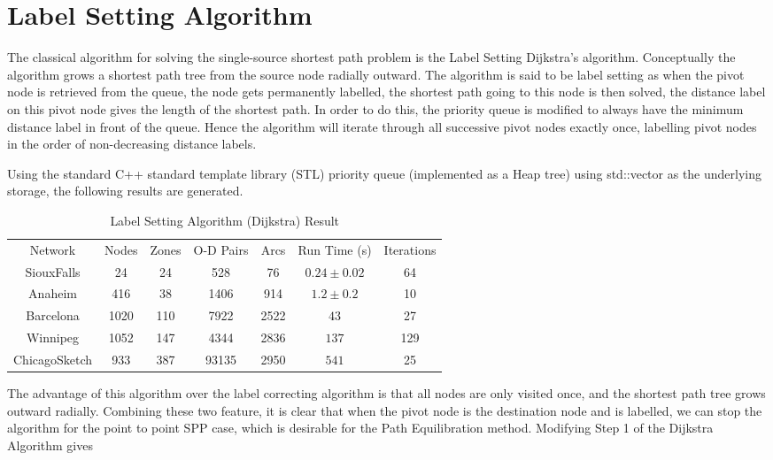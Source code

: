\section{Label Setting Algorithm}
The classical algorithm for solving the single-source shortest path problem is the Label Setting Dijkstra's algorithm.
Conceptually the algorithm grows a shortest path tree from the source node radially outward.
The algorithm is said to be label setting as when the pivot node is retrieved from the queue,
the node gets permanently labelled,
the shortest path going to this node is then solved,
the distance label on this pivot node gives the length of the shortest path.
In order to do this, 
the priority queue is modified to always have the minimum distance label in front of the queue.
Hence the algorithm will iterate through all successive pivot nodes exactly once,
labelling pivot nodes in the order of non-decreasing distance labels.


Using the standard C++ standard template library (STL) priority queue (implemented as a Heap tree) using std::vector as the underlying storage,
the following results are generated.
\begin{table}[H]
    \centering
    \begin{tabular}{ccccccc}
        Network & Nodes & Zones & O-D Pairs & Arcs & Run Time (s) & Iterations \\
        SiouxFalls    & 24   & 24  & 528   & 76   & $ 0.24 \pm 0.02 $ & 64 \\
        Anaheim       & 416  & 38  & 1406  & 914  & $ 1.2 \pm 0.2  $ & 10 \\
        Barcelona     & 1020 & 110 & 7922  & 2522 & $ 43   $ & 27 \\
        Winnipeg      & 1052 & 147 & 4344  & 2836 & $ 137  $ & 129 \\
        ChicagoSketch & 933  & 387 & 93135 & 2950 & $ 541  $ & 25 
    \end{tabular}
    \caption{Label Setting Algorithm (Dijkstra) Result}
\end{table}

The advantage of this algorithm over the label correcting algorithm is
that all nodes are only visited once,
and the shortest path tree grows outward radially.
Combining these two feature,
it is clear that when the pivot node is the destination node and is 
labelled,
we can stop the algorithm for the point to point SPP case,
which is desirable for the Path Equilibration method.
Modifying Step 1 of the Dijkstra Algorithm gives

